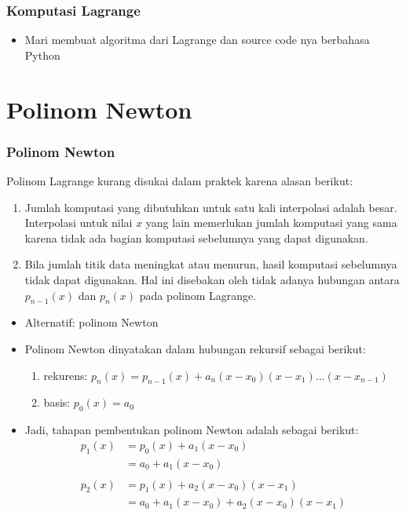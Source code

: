 \documentclass[pdflatex,compress,mathserif]{beamer}
\begin{document}
\begin{frame}
	\frametitle{Komputasi Lagrange}
	\begin{itemize}
		\item Mari membuat algoritma dari Lagrange dan source code nya berbahasa Python
	\end{itemize}
\end{frame}

\section{Polinom Newton}

\begin{frame}
	\frametitle{Polinom Newton}
	Polinom Lagrange kurang disukai dalam praktek karena alasan berikut:
	\begin{enumerate}
		\item Jumlah komputasi yang dibutuhkan untuk satu kali interpolasi adalah besar. Interpolasi untuk nilai $ x $ yang lain memerlukan jumlah komputasi yang sama karena tidak ada bagian komputasi sebelumnya yang dapat digunakan.
		\item Bila jumlah titik data meningkat atau menurun, hasil komputasi sebelumnya tidak dapat digunakan. Hal ini disebakan oleh tidak adanya hubungan antara $ p_{n-1}(x) $ dan $ p_n(x) $ pada polinom Lagrange.
	\end{enumerate}
\end{frame}

\begin{frame}
	\begin{itemize}
		\item Alternatif: polinom Newton
		\item Polinom Newton dinyatakan dalam hubungan rekursif sebagai berikut:
		\begin{enumerate}
			\item rekurens: $ p_n(x) = p_{n-1}(x) + a_n(x - x_0)(x - x_1) \dots (x - x_{n-1} ) $
			\item basis: $ p_0(x) = a_0 $
		\end{enumerate}
		\item Jadi, tahapan pembentukan polinom Newton adalah sebagai berikut:
		\begin{align*}
			p_1(x) &= p_0(x) + a_1 (x - x_0) \\
			&= a_0 + a_1 (x - x_0)\\
			&\\
			p_2(x) &= p_1(x) + a_2 (x - x_0)(x - x_1) \\
			&= a_0 + a_1 (x - x_0) + a_2 (x - x_0)(x - x_1)
		\end{align*}
	\end{itemize}
\end{frame}
\end{document}
